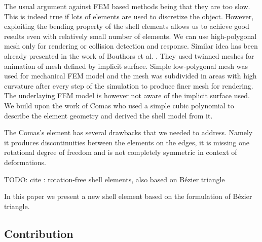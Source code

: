 \documentclass{egpubl}
\begin{document}
The usual argument against FEM based methods being that they are too slow.
This is indeed true if lots of elements are used to discretize the object.
However, exploiting the bending property of the shell elements allows us to
achieve good results even with relatively small number of elements. We can
use high-polygonal mesh only for rendering or collision detection and
response. Similar idea has been already presented in the work of Bouthors
et al. \cite{Bouthors2007}. They used twinned meshes for animation of mesh
defined by implicit surface. Simple low-polygonal mesh was used for
mechanical FEM model and the mesh was subdivided in areas with high
curvature after every step of the simulation to produce finer mesh for
rendering. The underlaying FEM model is however not aware of the implicit
surface used. We build upon the work of Comas \cite{Comas2010c} who used a
simple cubic polynomial to describe the element geometry and derived the
shell model from it.

The Comas's element has several drawbacks that we needed to address. Namely
it produces discontinuities between the elements on the edges, it is
missing one rotational degree of freedom and is not completely symmetric in
context of deformations.

TODO: cite \cite{Ubach2010}: rotation-free shell elements, also based on
Bézier triangle

In this paper we present a new shell element based on the formulation of
Bézier triangle.

\subsection{Contribution}
\end{document}
